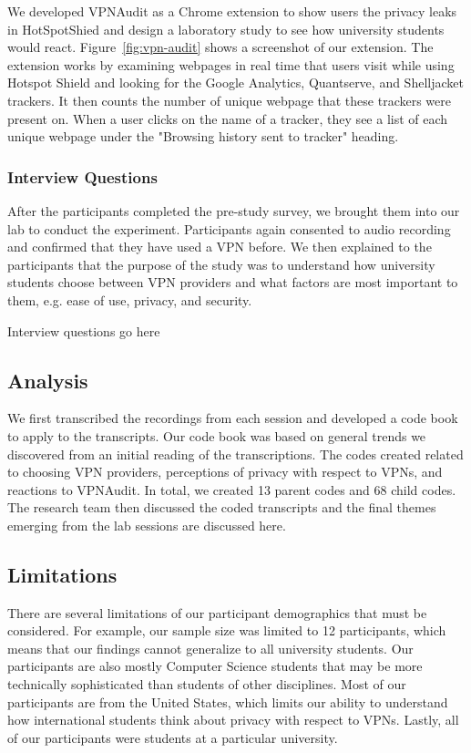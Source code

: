 We developed VPNAudit as a Chrome extension to show users the privacy leaks in HotSpotShied and design a laboratory study to see how university students would react.
Figure~\ref{fig:vpn-audit} shows a screenshot of our extension.
The extension works by examining webpages in real time that users visit while using Hotspot Shield and looking for the Google Analytics, Quantserve, and Shelljacket trackers.
It then counts the number of unique webpage that these trackers were present on.
When a user clicks on the name of a tracker, they see a list of each unique webpage under the "Browsing history sent to tracker" heading. 

\subsubsection{Interview Questions}
After the participants completed the pre-study survey, we brought them into our lab to conduct the experiment.
Participants again consented to audio recording and confirmed that they have used a VPN before.
We then explained to the participants that the purpose of the study was to understand how university students choose between VPN providers and what factors are most important to them, e.g. ease of use, privacy, and security.



Interview questions go here 

\subsection{Analysis}
We first transcribed the recordings from each session and developed a code book to apply to the transcripts.
Our code book was based on general trends we discovered from an initial reading of the transcriptions.
The codes created related to choosing VPN providers, perceptions of privacy with respect to VPNs, and reactions to VPNAudit.
In total, we created 13 parent codes and 68 child codes.  The research team then discussed the coded transcripts and the final themes emerging from the lab sessions are discussed here.

\subsection{Limitations}
There are several limitations of our participant demographics that must be considered.
For example, our sample size was limited to 12 participants, which means that our findings cannot generalize to all university students.
Our participants are also mostly Computer Science students that may be more technically sophisticated than students of other disciplines.
Most of our participants are from the United States, which limits our ability to understand how international students think about privacy with respect to VPNs.
Lastly, all of our participants were students at a particular university.

